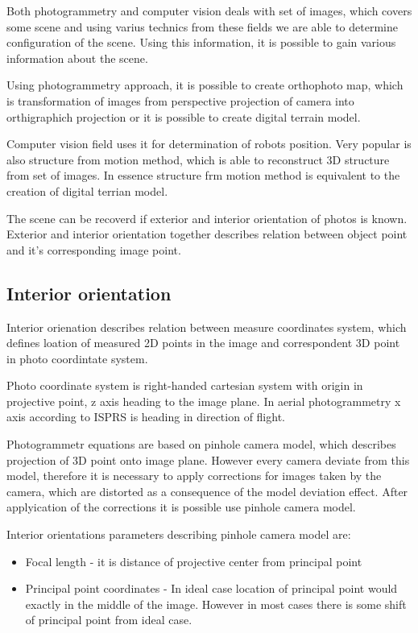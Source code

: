 \documentclass[a4paper,12pt]{report}
\begin{document}
Both photogrammetry and computer vision deals with set of images, which covers some scene 
and using varius technics from these fields we are able to determine configuration of the scene. 
Using this information, it is possible to gain various information about the scene. 

Using photogrammetry approach, it is possible to create orthophoto map, which is transformation of images from 
perspective projection of camera  into orthigraphich projection or it is possible to create digital terrain model.

Computer vision field uses it for determination of robots position. Very popular is also structure from motion method,
which is able to reconstruct 3D structure from set of images. In essence structure frm motion method is equivalent to the creation 
of digital terrian model.

The scene can be recoverd if exterior and interior orientation of photos is known.
Exterior and interior orientation together describes relation between object point and
it's corresponding image point.

\subsection{Interior orientation}

Interior orienation describes relation between measure coordinates system, which defines loation of measured 2D points in the image 
and correspondent 3D point in photo coordintate system.

Photo coordinate system is right-handed cartesian system with origin in projective point, z axis heading to the image plane. In aerial photogrammetry
x axis according to ISPRS is heading in direction of flight. 

Photogrammetr equations are based on pinhole camera model, which describes projection of 3D point onto image plane. 
However every camera deviate from this model, therefore it is necessary to apply corrections for images taken by the camera,
which are distorted  as a consequence of the model deviation effect.
After applyication of the corrections it is possible use pinhole camera model.

Interior orientations parameters describing pinhole camera model are:
\begin{itemize}
  \item Focal length - it is distance of projective center from principal point
  \item Principal point coordinates - In ideal case location of principal point would exactly in the middle 
	of the image.  
	However in most cases there is some shift of principal point from ideal case.
\end{itemize}
\end{document}

